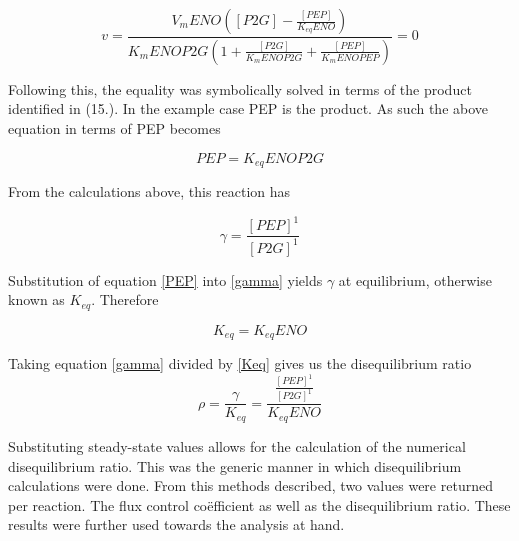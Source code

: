 \begin{equation}
v = \frac{V_mENO([P2G] - \frac{[PEP]}{K_{eq}ENO})}{K_mENOP2G(1 + \frac{[P2G]}{K_mENOP2G} + \frac{[PEP]}{K_mENOPEP})} = 0
\end{equation}

Following this, the equality was symbolically solved in terms of the product identified in (15.). In the example case PEP is the product. As such the above equation in terms of PEP becomes

\begin{equation}\label{PEP}
PEP = K_{eq}ENOP2G
\end{equation}

From the calculations above, this reaction has

\begin{equation}\label{gamma}
\gamma=\frac{[PEP]^1}{[P2G]^1}
\end{equation}

Substitution of equation \ref{PEP} into \ref{gamma} yields $\gamma$ at equilibrium, otherwise known as $K_{eq}$. Therefore

\begin{equation}\label{Keq}
K_{eq}=K_{eq}ENO
\end{equation}

Taking equation \ref{gamma} divided by \ref{Keq} gives us the disequilibrium ratio
\begin{equation}
\rho = \frac{\gamma}{K_{eq}} = \frac{\frac{[PEP]^1}{[P2G]^1}}{K_{eq}ENO}
\end{equation}

Substituting steady-state values allows for the calculation of the numerical disequilibrium ratio. This was the generic manner in which disequilibrium calculations were done. From this methods described, two values were returned per reaction. The flux control co\"efficient as well as the disequilibrium ratio. These results were further used towards the analysis at hand.
